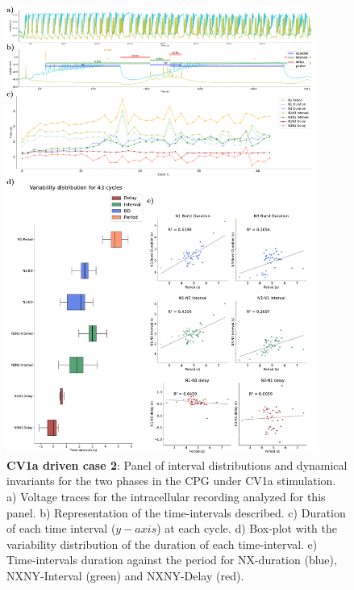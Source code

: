 \begin{figure}[htbp]
	\centering
	\includegraphics[width=0.9\textwidth]{./img/invariants/data/SUSSEX/CV1a_driven2/images/panel_with_intervals.pdf}
	\caption{\textbf{CV1a driven case 2}: Panel of interval distributions and dynamical invariants for the two phases in the CPG under CV1a stimulation. a) Voltage traces for the intracellular recording analyzed for this panel. b) Representation of the time-intervals described. c) Duration of each time interval ($y-axis$) at each cycle. d) Box-plot with the variability distribution of the duration of each time-interval. e) Time-intervals duration against the period for NX-duration (blue), NXNY-Interval (green) and NXNY-Delay (red).}
	\label{fig:cv1a 2 2phases}
\end{figure}



